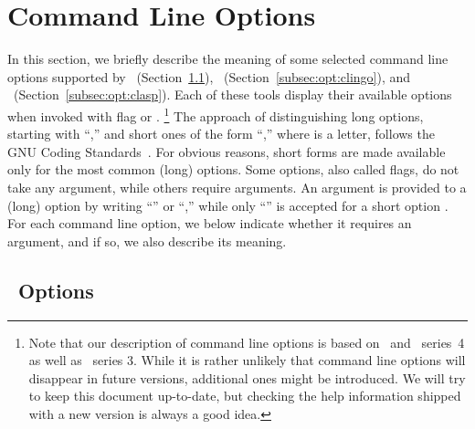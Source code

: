 \section{Command Line Options}\label{sec:options}

In this section, we briefly describe the meaning of
some selected command line options supported by
\gringo\ (Section~\ref{subsec:opt:gringo}),
\clingo\ (Section~\ref{subsec:opt:clingo}), and
\clasp\ (Section~\ref{subsec:opt:clasp}).
Each of these tools display their available options
when invoked with flag  or .%
\footnote{%
  Note that our description of command line options
  is based on \gringo\ and \clingo\ series~4
  as well as \clasp\ series 3.
  While it is rather unlikely that command line options will
  disappear in future versions,
  additional ones might be introduced.
  We will try to keep this document up-to-date,
  but checking the help information shipped 
  with a new version is always a good idea.}
The approach of distinguishing long options, starting with ``\code{--},''
and short ones of the form ``,''
where  is a letter,
follows the GNU Coding Standards~\cite{GNUcoding}.
For obvious reasons,
short forms are made available only for the most common (long) options.
Some options, also called flags, do not take any argument,
while others require arguments.
An argument  is provided to a (long) option 
by writing 
``'' or
``,''
while only
``''
is accepted for a short option .
For each command line option,
we below indicate whether it requires an argument,
and if so, we also describe its meaning.


\subsection{\gringo\ Options}\label{subsec:opt:gringo}

